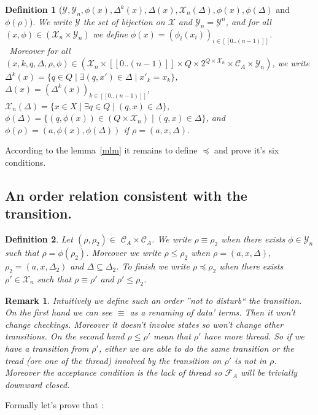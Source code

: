 \documentclass[a4paper,10pt]{report}
\newtheorem{df}{Definition}
\newtheorem{rk}{Remark}
\newcommand{\seg}[1]{[\![#1]\!]}
\newcommand{\ts}{\seg{0 .. (n-1)}}
\newcommand{\C}{\mathcal{C}_{A}}
\newcommand{\F}{\mathcal{F}_{A}}
\newcommand{\Xa}{\mathcal{X}}
\newcommand{\X}{\mathcal{X}_{n}}
\newcommand{\Ya}{\mathcal{Y}}
\newcommand{\Y}{\mathcal{Y}_{n}}
\begin{document}
\begin{df}[$\Ya, \Y, \phi(x),\Delta^k(x),\Delta(x), \X(\Delta),\phi(x), \phi(\Delta)$ and $ \phi(\rho)$]
We write $\Ya$ the set of bijection on $\Xa$ and $\Y = \Ya^n$, and
for all $(x,\phi) \in (\X \times \Y)$ we define $\phi(x) = (\phi_i(x_i))_{i \in \ts} $. \\\  
Moreover for all $(x,k,q,\Delta,\rho,\phi) \in (\X \times \ts \times Q \times 2^{Q \times \X} \times \C \times \Y)$, we write 
$\Delta^k(x) = \{q \in Q \mid \exists  (q,x') \in \Delta \mid x'_k = x_k\}$,
$\Delta(x) = {(\Delta^k(x))}_{k \in \ts}$,
$\X(\Delta) = \{ x\in X \mid \exists q\in Q \mid (q,x) \in \Delta \}$,
$\phi(\Delta) = \{ (q,\phi(x)) \in (Q \times \X) \mid (q,x) \in \Delta \}$,
and $\phi(\rho) = (a,\phi(x),\phi(\Delta))$ if $\rho = (a,x,\Delta)$.
\end{df}


According to the lemma~\ref{mlm} it remains to define $\preceq$ and prove it's six conditions.

\subsection{An order relation consistent with the transition.}
\begin{df}
  Let $(\rho,\rho_2) \in$  $\C\times\C$.
  We write $\rho \equiv \rho_2$ when there exists $\phi \in \Y$ such that  $ \rho = \phi(\rho_2)$.    
  Moreover we write $\rho \leq \rho_2$ when $ \rho=(a ,x, \Delta  )$, $\rho_2=(a ,x, \Delta_2  )$ and $\Delta \subseteq \Delta_2$.
  To finish we write $\rho \preceq \rho_2$ when there exists $\rho' \in \X$ such that $\rho \equiv \rho'$ and $\rho' \leq \rho_2$.
\end{df}



\begin{rk}
  Intuitively we define such an order ''not to disturb`` the transition.
  On the first hand we can see $\equiv$ as a renaming of data' terms. Then it won't change checkings. Moreover it doesn't involve states so won't change other transitions. 
  On the second hand $\rho \leq \rho'$ mean that $\rho'$ have more thread. So if we have a transition from $\rho'$, either we are able to do the same transition 
  or the tread (ore one of the thread) involved by the transition on $\rho'$ is not in $\rho$. 
  Moreover the acceptance condition is the lack of thread so $\F$ will be trivially downward closed. 
\end{rk}

Formally let's prove that :
\end{document}
